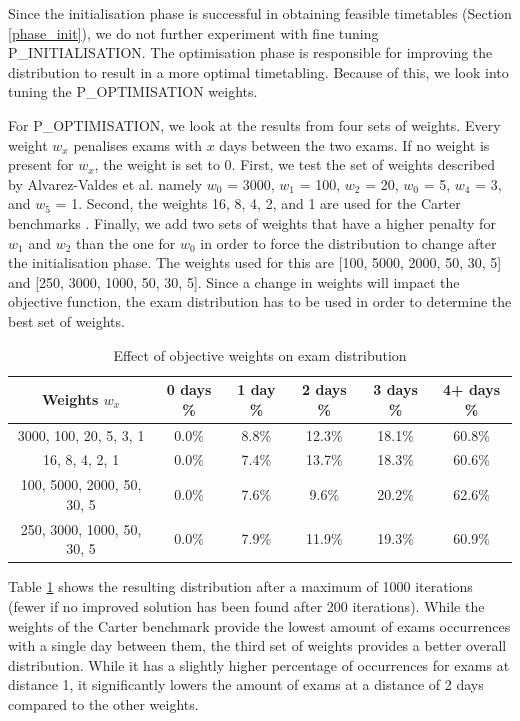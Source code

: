 Since the initialisation phase is successful in obtaining feasible timetables (Section \ref{phase_init}), we do not further experiment with fine tuning P\_INITIALISATION. The optimisation phase is responsible for improving the distribution to result in a more optimal timetabling. Because of this, we look into tuning the P\_OPTIMISATION weights.

For P\_OPTIMISATION, we look at the results from four sets of weights. Every weight $w_x$ penalises exams with $x$ days between the two exams. If no weight is present for $w_x$, the weight is set to 0.  First, we test the set of weights described by Alvarez-Valdes et al. namely $w_0$ = 3000, $w_1$ = 100, $w_2$ = 20, $w_0$ = 5, $w_4$ = 3, and $w_5$ = 1. Second, the weights 16, 8, 4, 2, and 1 are used for the Carter benchmarks \cite{carter1996}. Finally, we add two sets of weights that have a higher penalty for $w_1$ and $w_2$ than the one for $w_0$ in order to force the distribution to change after the initialisation phase. The weights used for this are [100, 5000, 2000, 50, 30, 5] and [250, 3000, 1000, 50, 30, 5]. Since a change in weights will impact the objective function, the exam distribution has to be used in order to determine the best set of weights.

\begin{table}[h]
	\caption{Effect of objective weights on exam distribution}
	\label{tab:weights_distr}
	\centering
	\begin{tabular}{c c c c c c}
		\hline
  	\textbf{Weights $w_x$}	&
   \textbf{0 days \% } &
    \textbf{1 day \% } & 
    \textbf{2 days \% } &
    \textbf{3 days \% } & 
    \textbf{4+ days \%}\\ \hline
    3000, 100, 20, 5, 3, 1 & 0.0\% &  8.8\% & 12.3\% & 18.1\% & 60.8\% \\
    16, 8, 4, 2, 1 & 0.0\% & 7.4\% & 13.7\% & 18.3\% & 60.6\% \\
    100, 5000, 2000, 50, 30, 5 & 0.0\% & 7.6\% & 9.6\% & 20.2\% & 62.6\% \\
    250, 3000, 1000, 50, 30, 5 & 0.0\% &  7.9\% & 11.9\% & 19.3\% & 60.9\% \\
        \hline%
	\end{tabular}
\end{table}

Table \ref{tab:weights_distr} shows the resulting distribution after a maximum of 1000 iterations (fewer if no improved solution has been found after 200 iterations). While the weights of the Carter benchmark provide the lowest amount of exams occurrences with a single day between them, the third set of weights provides a better overall distribution. While it has a slightly higher percentage of occurrences for exams at distance 1, it significantly lowers the amount of exams at a distance of 2 days compared to the other weights.


